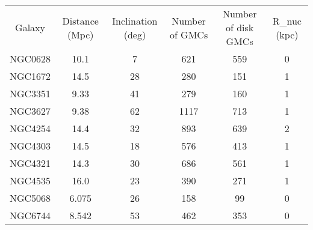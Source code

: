 \begin{table}
\begin{tabular}{cccccc}
Galaxy & Distance (Mpc) & Inclination (deg) & Number of GMCs & Number of disk GMCs & R_{nuc} (kpc) \\
NGC0628 & 10.1 & 7 & 621 & 559 & 0 \\
NGC1672 & 14.5 & 28 & 280 & 151 & 1 \\
NGC3351 & 9.33 & 41 & 279 & 160 & 1 \\
NGC3627 & 9.38 & 62 & 1117 & 713 & 1 \\
NGC4254 & 14.4 & 32 & 893 & 639 & 2 \\
NGC4303 & 14.5 & 18 & 576 & 413 & 1 \\
NGC4321 & 14.3 & 30 & 686 & 561 & 1 \\
NGC4535 & 16.0 & 23 & 390 & 271 & 1 \\
NGC5068 & 6.075 & 26 & 158 & 99 & 0 \\
NGC6744 & 8.542 & 53 & 462 & 353 & 0 \\
\end{tabular}
\end{table}
